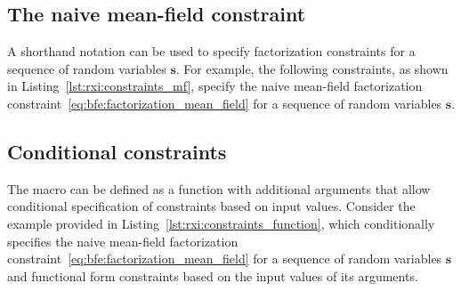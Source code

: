 \subsection{The naive mean-field constraint}

A shorthand notation can be used to specify factorization constraints for a sequence of random
variables $\bm{s}$.
For example, the following constraints, as shown in Listing~\ref{lst:rxi:constraints_mf},
specify the naive mean-field factorization constraint~\eqref{eq:bfe:factorization_mean_field}
for a sequence of random variables $\bm{s}$.
\begin{figure*}[h!]
  \begin{adjustbox}{minipage=\textwidth,margin=0pt \smallskipamount,center}
  \end{adjustbox}
\end{figure*}

\subsection{Conditional constraints}

The  macro can be defined as a function with additional arguments that
allow conditional specification of constraints based on input values.
Consider the example provided in Listing~\ref{lst:rxi:constraints_function}, which conditionally
specifies the naive mean-field factorization
constraint~\eqref{eq:bfe:factorization_mean_field} for a sequence of random variables $\bm{s}$
and functional form constraints based on the input values of its arguments.
\begin{figure*}[h!]
  \begin{adjustbox}{minipage=\textwidth,margin=0pt \smallskipamount,center}
  \end{adjustbox}
\end{figure*}

